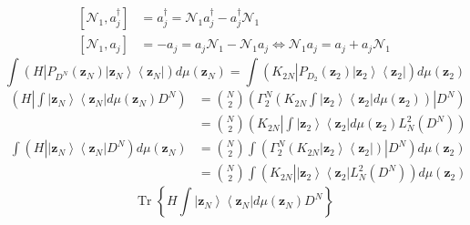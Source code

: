 \documentclass[aps,preprint]{revtex4}%
\begin{document}
%

\begin{align}
\left[  \mathcal{N}_{1},a_{j}^{\dagger}\right]   &  =a_{j}^{\dagger
}=\mathcal{N}_{1}a_{j}^{\dagger}-a_{j}^{\dagger}\mathcal{N}_{1}\nonumber\\
\left[  \mathcal{N}_{1},a_{j}\right]   &  =-a_{j}=a_{j}\mathcal{N}%
_{1}-\mathcal{N}_{1}a_{j}\Leftrightarrow\mathcal{N}_{1}a_{j}=a_{j}%
+a_{j}\mathcal{N}_{1}%
\end{align}%
\begin{equation}
\int\left(  H\left\vert P_{D^{N}}\left(  \mathbf{z}_{N}\right)  \left\vert
\mathbf{z}_{N}\right\rangle \left\langle \mathbf{z}_{N}\right\vert \right.
\right)  d\mu\left(  \mathbf{z}_{N}\right)  =\int\left(  K_{2N}\left\vert
P_{D_{2}}\left(  \mathbf{z}_{2}\right)  \left\vert \mathbf{z}_{2}\right\rangle
\left\langle \mathbf{z}_{2}\right\vert \right.  \right)  d\mu\left(
\mathbf{z}_{2}\right)
\end{equation}%
\begin{align}
\left(  H\left\vert \int\left\vert \mathbf{z}_{N}\right\rangle \left\langle
\mathbf{z}_{N}\right\vert d\mu\left(  \mathbf{z}_{N}\right)  D^{N}\right.
\right)   &  =\binom{N}{2}\left(  \Gamma_{2}^{N}\left(  K_{2N}\int\left\vert
\mathbf{z}_{2}\right\rangle \left\langle \mathbf{z}_{2}\right\vert d\mu\left(
\mathbf{z}_{2}\right)  \right)  \left\vert D^{N}\right.  \right) \\
&  =\binom{N}{2}\left(  K_{2N}\left\vert \int\left\vert \mathbf{z}%
_{2}\right\rangle \left\langle \mathbf{z}_{2}\right\vert d\mu\left(
\mathbf{z}_{2}\right)  L_{N}^{2}\left(  D^{N}\right)  \right.  \right)
\end{align}%
\begin{align}
\int\left(  H\left\vert \left\vert \mathbf{z}_{N}\right\rangle \left\langle
\mathbf{z}_{N}\right\vert D^{N}\right.  \right)  d\mu\left(  \mathbf{z}%
_{N}\right)   &  =\binom{N}{2}\int\left(  \Gamma_{2}^{N}\left(  K_{2N}%
\left\vert \mathbf{z}_{2}\right\rangle \left\langle \mathbf{z}_{2}\right\vert
\right)  \left\vert D^{N}\right.  \right)  d\mu\left(  \mathbf{z}_{2}\right)
\\
&  =\binom{N}{2}\int\left(  K_{2N}\left\vert \left\vert \mathbf{z}%
_{2}\right\rangle \left\langle \mathbf{z}_{2}\right\vert L_{N}^{2}\left(
D^{N}\right)  \right.  \right)  d\mu\left(  \mathbf{z}_{2}\right)
\end{align}%
\begin{equation}
\operatorname{Tr}\left\{  H\int\left\vert \mathbf{z}_{N}\right\rangle
\left\langle \mathbf{z}_{N}\right\vert d\mu\left(  \mathbf{z}_{N}\right)
D^{N}\right\}
\end{equation}%
\end{document}
